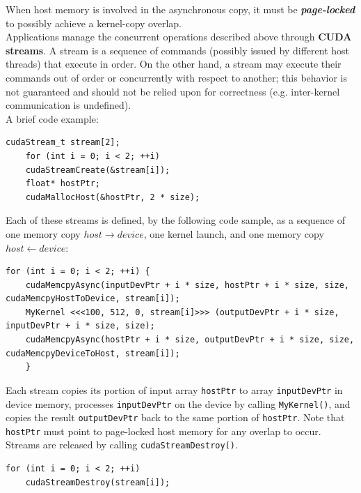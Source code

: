 	When host memory is involved in the asynchronous copy, it must be
	\textit{\textbf{page-locked}} to possibly achieve a kernel-copy overlap\cite{cudastrandconcurr}.\\
	
	
	
	Applications manage the concurrent operations described above through \textbf{CUDA streams}. A stream is a sequence of commands (possibly issued by different host threads) that execute in order. On the other hand, a stream may execute their commands out of order or concurrently with respect to another; this behavior is not guaranteed and	should not be relied upon for correctness (e.g. inter-kernel communication is undefined)\cite{cudaguide,custreamsblog}.\\
	A brief code example:
	\begin{lstlisting}[caption={CUDA Strams creation}]
	cudaStream_t stream[2];
	for (int i = 0; i < 2; ++i)
	cudaStreamCreate(&stream[i]);
	float* hostPtr;
	cudaMallocHost(&hostPtr, 2 * size);
	\end{lstlisting}	
	
	Each of these streams is defined, by the following code sample, as a sequence of one memory copy \(host \rightarrow device\), one kernel launch, and one memory copy \(host \leftarrow device\):
	\begin{lstlisting}[caption={CUDA Strams and Async example}]
	for (int i = 0; i < 2; ++i) {
	cudaMemcpyAsync(inputDevPtr + i * size, hostPtr + i * size, size, cudaMemcpyHostToDevice, stream[i]);
	MyKernel <<<100, 512, 0, stream[i]>>> (outputDevPtr + i * size, inputDevPtr + i * size, size);
	cudaMemcpyAsync(hostPtr + i * size, outputDevPtr + i * size, size, cudaMemcpyDeviceToHost, stream[i]);
	}
	\end{lstlisting}
	
	Each stream copies its portion of input array \texttt{hostPtr} to array \texttt{inputDevPtr} in device memory, processes \texttt{inputDevPtr} on the device by calling \texttt{MyKernel()}, and copies
	the result \texttt{outputDevPtr} back to the same portion of \texttt{hostPtr}. Note that \texttt{hostPtr} must point to page-locked host memory for any overlap to
	occur.\\
	Streams are released by calling \texttt{cudaStreamDestroy()}.
	\begin{lstlisting}[caption={CUDA Strams destroy}]
	for (int i = 0; i < 2; ++i)
	cudaStreamDestroy(stream[i]);
	\end{lstlisting}


